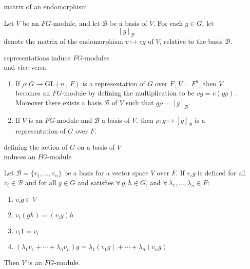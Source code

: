 \documentclass[avery5371,grid]{flashcards}
\newcommand{\B}{\mathscr{B}}
\newcommand{\GLnF}[2]{\ensuremath{\textrm{GL} \left( #1 \, , \, #2 \right)}}
\begin{document}
\begin{flashcard}[Definition 4.3]{matrix of an endomorphism}

  Let $V$ be an $FG$-module, and let $\B$ be a basis of $V$. For each
  $g\in G$, let
  \[
    [g]_{\B}
  \]
  denote the matrix of the endomorphism $v \mapsto vg$ of $V$,
  relative to the basis $\B$.

\end{flashcard}

\begin{flashcard}[Theorem 4.4]{representations induce $FG$-modules \\
    and vice versa}

  \begin{enumerate}
  \item If $\rho: G \to \GLnF{n}{F}$ is a representation of $G$ over
    $F$, $V=F^n$, then $V$ becomes an $FG$-module by defining the
    multiplication to be $vg = v(g\rho)$. Moreover there exists a
    basis $\B$ of $V$ such that $g\rho = [g]_{\B}$.

  \item If $V$ is an $FG$-module and $\B$ a basis of $V$, then
    $\rho: g \mapsto [g]_{\B}$ is  a representation of $G$ over $F$.
  \end{enumerate}

\end{flashcard}

\begin{flashcard}[Proposition 4.6]{defining the action of $G$ on a basis of $V$\\
  induces an $FG$-module}

  Let $\B=\{v_1, \ldots , v_n\}$ be a basis for a vector space $V$
  over $F$. If $v_i g$ is defined for all $v_i \in \B$ and for all
  $g\in G$ and satisfies $\forall \, g, h\in G$, and
  $\forall \, \lambda_1, \ldots, \lambda_n \in F$:
  \begin{enumerate}
  \item $v_i g \in V$
  \item $v_i(gh) = (v_i g)h$
  \item $v_i 1 = v_i$
  \item $(\lambda_1 v_1 + \cdots + \lambda_n v_n)g =
    \lambda_1(v_1 g) + \cdots + \lambda_n (v_n g)$
  \end{enumerate}
  Then $V$ is an $FG$-module.

\end{flashcard}
\end{document}
